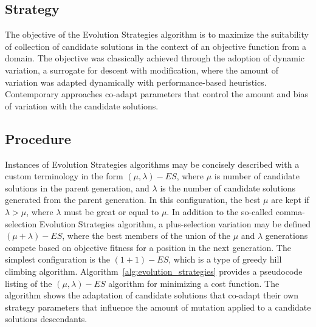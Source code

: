 \subsection{Strategy}
The objective of the Evolution Strategies algorithm is to maximize the suitability of collection of candidate solutions in the context of an objective function from a domain.
The objective was classically achieved through the adoption of dynamic variation, a surrogate for descent with modification, where the amount of variation was adapted dynamically with performance-based heuristics. Contemporary approaches co-adapt parameters that control the amount and bias of variation with the candidate solutions.

\subsection{Procedure}
Instances of Evolution Strategies algorithms may be concisely described with a custom terminology in the form $(\mu,\lambda)-ES$, where $\mu$ is number of candidate solutions in the parent generation, and $\lambda$ is the number of candidate solutions generated from the parent generation. In this configuration, the best $\mu$ are kept if $\lambda > \mu$, where $\lambda$ must be great or equal to $\mu$. In addition to the so-called comma-selection Evolution Strategies algorithm, a plus-selection variation may be defined $(\mu + \lambda)-ES$, where the best members of the union of the $\mu$ and $\lambda$ generations compete based on objective fitness for a position in the next generation. The simplest configuration is the $(1+1)-ES$, which is a type of greedy hill climbing algorithm.
Algorithm~\ref{alg:evolution_strategies} provides a pseudocode listing of the $(\mu,\lambda)-ES$ algorithm for minimizing a cost function. The algorithm shows the adaptation of candidate solutions that co-adapt their own strategy parameters that influence the amount of mutation applied to a candidate solutions descendants. 

